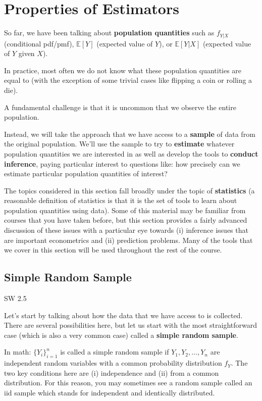 \documentclass[
  letterpaper,
  DIV=11,
  numbers=noendperiod]{scrreprt}
\begin{document}

\chapter{Properties of Estimators}\label{properties-of-estimators}

So far, we have been talking about \textbf{population quantities} such
as \(f_{Y|X}\) (conditional pdf/pmf), \(\mathbb{E}[Y]\) (expected value
of \(Y\)), or \(\mathbb{E}[Y|X]\) (expected value of \(Y\) given \(X\)).

In practice, most often we do not know what these population quantities
are equal to (with the exception of some trivial cases like flipping a
coin or rolling a die).

A fundamental challenge is that it is uncommon that we observe the
entire population.

Instead, we will take the approach that we have access to a
\textbf{sample} of data from the original population. We'll use the
sample to try to \textbf{estimate} whatever population quantities we are
interested in as well as develop the tools to \textbf{conduct
inference}, paying particular interest to questions like: how precisely
can we estimate particular population quantities of interest?

The topics considered in this section fall broadly under the topic of
\textbf{statistics} (a reasonable definition of statistics is that it is
the set of tools to learn about population quantities using data). Some
of this material may be familiar from courses that you have taken
before, but this section provides a fairly advanced discussion of these
issues with a particular eye towards (i) inference issues that are
important econometrics and (ii) prediction problems. Many of the tools
that we cover in this section will be used throughout the rest of the
course.

\section{Simple Random Sample}\label{simple-random-sample}

SW 2.5

Let's start by talking about how the data that we have access to is
collected. There are several possibilities here, but let us start with
the most straightforward case (which is also a very common case) called
a \textbf{simple random sample}.

In math: \(\{Y_i\}_{i=1}^n\) is called a simple random sample if
\(Y_1, Y_2, \ldots, Y_n\) are independent random variables with a common
probability distribution \(f_Y\). The two key conditions here are (i)
independence and (ii) from a common distribution. For this reason, you
may sometimes see a random sample called an iid sample which stands for
independent and identically distributed.
\end{document}
